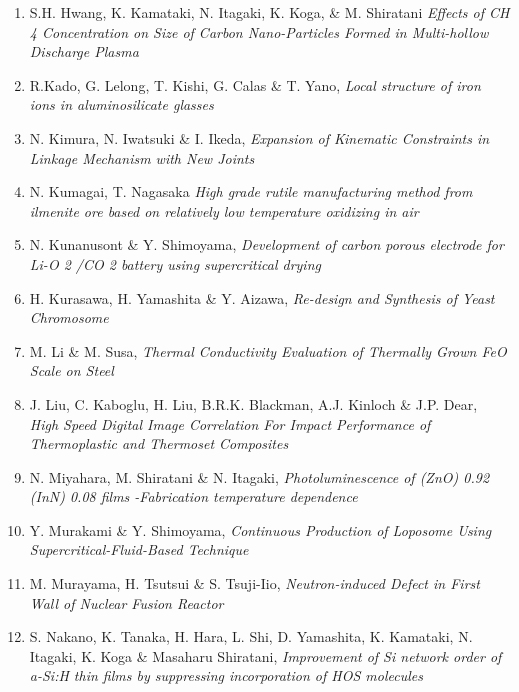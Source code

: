 \begin{enumerate}[label=A\arabic*]
\item S.H. Hwang, K. Kamataki, N. Itagaki, K. Koga, \& M. Shiratani {\em Effects of CH 4 Concentration on Size of
Carbon Nano-Particles Formed in Multi-hollow
Discharge Plasma}

\item R.Kado, G. Lelong, T. Kishi, G. Calas \& T. Yano, {\em Local structure of iron ions
in aluminosilicate glasses}

\item N. Kimura, N. Iwatsuki \& I. Ikeda, {\em Expansion of Kinematic Constraints in Linkage
Mechanism with New Joints}

\item N. Kumagai, T. Nagasaka {\em High grade rutile manufacturing method from ilmenite ore based on relatively low temperature oxidizing in air}

\item     N. Kunanusont \& Y. Shimoyama, {\em Development of carbon porous electrode
for Li-O 2 /CO 2 battery using supercritical drying}

\item  H. Kurasawa, H. Yamashita \& Y. Aizawa, {\em Re-design and Synthesis of Yeast Chromosome}

\item M. Li \& M. Susa, {\em Thermal Conductivity Evaluation of Thermally
Grown FeO Scale on Steel}

\item J. Liu, C. Kaboglu, H. Liu, B.R.K. Blackman, A.J. Kinloch \& J.P. Dear, {\em
  High Speed Digital Image Correlation For Impact
Performance of Thermoplastic and Thermoset
Composites}

\item N. Miyahara, M. Shiratani \& N. Itagaki, {\em Photoluminescence of (ZnO) 0.92 (InN) 0.08 films
-Fabrication temperature dependence}

\item Y. Murakami \& Y. Shimoyama, {\em Continuous Production of Loposome
Using Supercritical-Fluid-Based Technique}

\item M. Murayama, H. Tsutsui \& S. Tsuji-Iio, {\em Neutron-induced Defect in First Wall of Nuclear
Fusion Reactor}

\item S. Nakano, K. Tanaka, H. Hara, L. Shi, D. Yamashita,
K. Kamataki, N. Itagaki, K. Koga \& Masaharu Shiratani, {\em Improvement of Si network order of a-Si:H thin
films by suppressing incorporation of
HOS molecules}


\end{enumerate}
